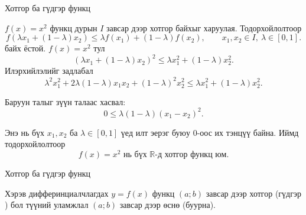 \begin{frame}[allowframebreaks]{Хотгор ба гүдгэр функц}
\begin{example}
$f(x)=x^2$ функц дурын $I$ завсар дээр хотгор байхыг харуулая. Тодорхойлолтоор 
\[
f(\lambda x_1+(1-\lambda)x_2)
\leq
\lambda f(x_1)+(1-\lambda)f(x_2),
\qquad
x_1,x_2\in I,\ \lambda\in[0,1].
\]
байх ёстой.  $f(x)=x^2$ тул
\[
(\lambda x_1+(1-\lambda)x_2)^2
\le
\lambda x_1^2+(1-\lambda)x_2^2.
\]
Илэрхийлэлийг задлабал
\[
\lambda^2x_1^2+2\lambda(1-\lambda)x_1x_2+(1-\lambda)^2x_2^2
\le
\lambda x_1^2+(1-\lambda)x_2^2.
\]

Баруун талыг зүүн талаас хасвал:
\[
0
\le
\lambda(1-\lambda)(x_1-x_2)^2.
\]

Энэ нь бүх $x_1,x_2$ ба $\lambda\in[0,1]$ үед илт эерэг буюу $0$-оос их тэнцүү байна.  
Иймд тодорхойлолтоор
\[
\boxed{f(x)=x^2 \text{ нь бүх } \mathbb{R}\text{-д хотгор функц юм.}}
\]
\end{example}
\begin{center}
\begin{fitbox}\end{fitbox}
\end{center}
\end{frame}

\begin{frame}[allowframebreaks]{Хотгор ба гүдгэр функц}
\begin{theorem}
    Хэрэв дифферинциалчлагдах $y=f(x)$ функц $(a;b)$  завсар дээр хотгор (гүдгэр ) бол түүний  уламжлал $(a;b)$ завсар дээр өснө (буурна).
\end{theorem}
\end{frame}

